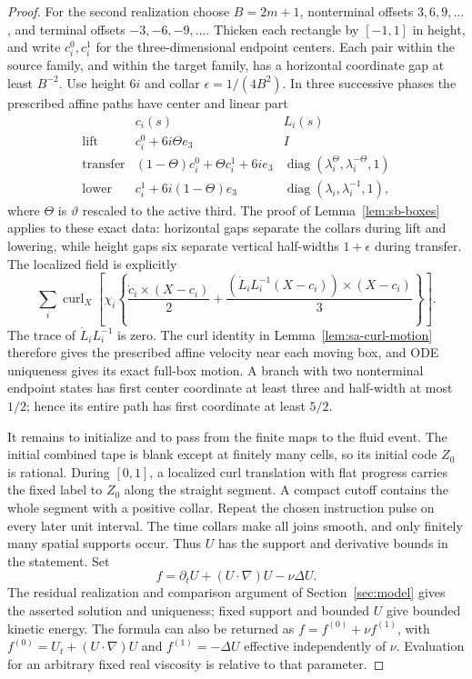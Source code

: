 \begin{proof}
For the second realization choose $B=2m+1$, nonterminal offsets
$3,6,9,\ldots$, and terminal offsets $-3,-6,-9,\ldots$.
Thicken each rectangle by $[-1,1]$ in height, and write $c_i^0,c_i^1$
for the three-dimensional endpoint centers. Each pair within the
source family, and within the target family, has a horizontal coordinate
gap at least $B^{-2}$. Use height $6i$ and collar
$\epsilon=1/(4B^2)$. In three successive phases the prescribed affine
paths have center and linear part
\[
\begin{array}{c|c|c}
 &c_i(s)&L_i(s)\\\hline
 \text{lift}&c_i^0+6i\Theta e_3&I\\
 \text{transfer}&(1-\Theta)c_i^0+\Theta c_i^1+6i e_3&
     \operatorname{diag}(\lambda_i^\Theta,\lambda_i^{-\Theta},1)\\
 \text{lower}&c_i^1+6i(1-\Theta)e_3&
     \operatorname{diag}(\lambda_i,\lambda_i^{-1},1),
\end{array}
\]
where $\Theta$ is $\vartheta$ rescaled to the active third.
The proof of Lemma~\ref{lem:sb-boxes} applies to these exact data:
horizontal gaps separate the collars during lift and lowering, while
height gaps six separate vertical half-widths $1+\epsilon$ during
transfer. The localized field is explicitly
\begin{equation}\label{eq:p2:rapid-moving-box}
 \sum_i\operatorname{curl}_X\left[
 \chi_i\left\{\frac{\dot c_i\times(X-c_i)}2+
       \frac{(\dot L_iL_i^{-1}(X-c_i))\times(X-c_i)}3\right\}\right].
\end{equation}
The trace of $\dot L_iL_i^{-1}$ is zero. The curl identity in
Lemma~\ref{lem:sa-curl-motion} therefore gives the prescribed affine
velocity near each moving box, and ODE uniqueness gives its exact
full-box motion. A branch with two nonterminal endpoint states has
first center coordinate at least three and half-width at most $1/2$;
hence its entire path has first coordinate at least $5/2$.

It remains to initialize and to pass from the finite maps to the fluid
event. The initial combined tape is blank except at finitely many cells,
so its initial code $Z_0$ is rational. During $[0,1]$, a localized curl
translation with flat progress carries the fixed label to $Z_0$ along
the straight segment. A compact cutoff contains the whole segment with
a positive collar. Repeat the chosen instruction pulse on every later
unit interval. The time collars make all joins smooth, and only
finitely many spatial supports occur. Thus $U$ has the support and
derivative bounds in the statement. Set
\[
 f=\partial_tU+(U\cdot\nabla)U-\nu\Delta U.
\]
The residual realization and comparison argument of
Section~\ref{sec:model} gives the asserted solution and uniqueness;
fixed support and bounded $U$ give bounded kinetic energy. The formula
can also be returned as $f=f^{(0)}+\nu f^{(1)}$, with
$f^{(0)}=U_t+(U\cdot\nabla)U$ and $f^{(1)}=-\Delta U$ effective
independently of $\nu$. Evaluation for an arbitrary fixed real viscosity
is relative to that parameter.


\end{proof}

